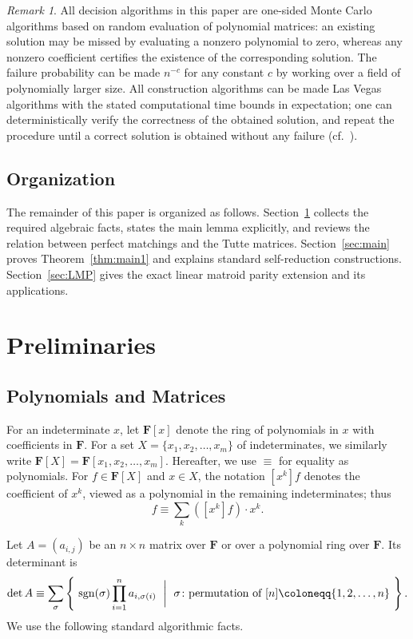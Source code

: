\documentclass[11pt, a4paper]{article}
\theoremstyle{plain}
\theoremstyle{definition}
\theoremstyle{remark}
\newtheorem{remark}[theorem]{Remark}
\newcommand{\bF}{\mathbf{F}}
\begin{document}
\begin{remark}\label{rem:LasVegas}
All decision algorithms in this paper are one-sided Monte Carlo algorithms based on random evaluation of polynomial matrices: an existing solution may be missed by evaluating a nonzero polynomial to zero, whereas any nonzero coefficient certifies the existence of the corresponding solution.
The failure probability can be made $n^{-c}$ for any constant $c$ by working over a field of polynomially larger size.
All construction algorithms can be made Las Vegas algorithms with the stated computational time bounds in expectation; one can deterministically verify the correctness of the obtained solution, and repeat the procedure until a correct solution is obtained without any failure (cf.~\cite[Section~3.5]{Harvey2009}).
\end{remark}


\subsection{Organization}
The remainder of this paper is organized as follows.
Section~\ref{sec:preliminaries} collects the required algebraic facts, states the main lemma explicitly, and reviews the relation between perfect matchings and the Tutte matrices.
Section~\ref{sec:main} proves Theorem~\ref{thm:main1} and explains standard self-reduction constructions.
Section~\ref{sec:LMP} gives the exact linear matroid parity extension and its applications.



\section{Preliminaries}\label{sec:preliminaries}
\subsection{Polynomials and Matrices}
For an indeterminate $x$, let $\bF[x]$ denote the ring of polynomials in $x$ with coefficients in $\bF$.
For a set $X=\{x_1,x_2,\dots,x_m\}$ of indeterminates, we similarly write $\bF[X]=\bF[x_1,x_2,\dots,x_m]$.
Hereafter, we use $\equiv$ for equality as polynomials.
For $f\in\bF[X]$ and $x\in X$, the notation $[x^k]f$ denotes the coefficient of $x^k$, viewed as a polynomial in the remaining indeterminates; thus
\[f \equiv \sum_k ([x^k]f) \cdot x^k.\]

Let $A=(a_{i,j})$ be an $n\times n$ matrix over $\bF$ or over a polynomial ring over $\bF$.
Its determinant is
\[\det A \equiv \sum_{\sigma} \left\{\ \mathrm{sgn}(\sigma)\prod_{i=1}^{n} a_{i, \sigma(i)} \ \biggm| \ \sigma \colon \text{permutation of $[n] \coloneqq \{1, 2, \dots, n\}$} \ \right\}.\]
We use the following standard algorithmic facts.
\end{document}
